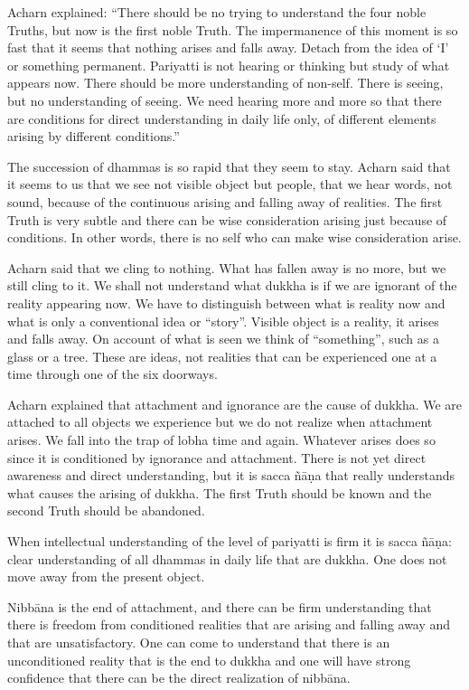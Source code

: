 Acharn explained: ``There should be no trying to understand the four
noble Truths, but now is the first noble Truth. The impermanence of this
moment is so fast that it seems that nothing arises and falls away.
Detach from the idea of `I' or something permanent. Pariyatti is not
hearing or thinking but study of what appears now. There should be more
understanding of non-self. There is seeing, but no understanding of
seeing. We need hearing more and more so that there are conditions for
direct understanding in daily life only, of different elements arising
by different conditions.''

The succession of dhammas is so rapid that they seem to stay. Acharn
said that it seems to us that we see not visible object but people, that
we hear words, not sound, because of the continuous arising and falling
away of realities. The first Truth is very subtle and there can be wise
consideration arising just because of conditions. In other words, there
is no self who can make wise consideration arise.

Acharn said that we cling to nothing. What has fallen away is no more,
but we still cling to it. We shall not understand what dukkha is if we
are ignorant of the reality appearing now. We have to distinguish
between what is reality now and what is only a conventional idea or
``story''. Visible object is a reality, it arises and falls away. On
account of what is seen we think of ``something'', such as a glass or a
tree. These are ideas, not realities that can be experienced one at a
time through one of the six doorways.

Acharn explained that attachment and ignorance are the cause of dukkha.
We are attached to all objects we experience but we do not realize when
attachment arises. We fall into the trap of lobha time and again.
Whatever arises does so since it is conditioned by ignorance and
attachment. There is not yet direct awareness and direct understanding,
but it is sacca ñāṇa that really understands what causes the arising of
dukkha. The first Truth should be known and the second Truth should be
abandoned.

When intellectual understanding of the level of pariyatti is firm it is
sacca ñāṇa: clear understanding of all dhammas in daily life that are
dukkha. One does not move away from the present object.

Nibbāna is the end of attachment, and there can be firm understanding
that there is freedom from conditioned realities that are arising and
falling away and that are unsatisfactory. One can come to understand
that there is an unconditioned reality that is the end to dukkha and one
will have strong confidence that there can be the direct realization of
nibbāna.

